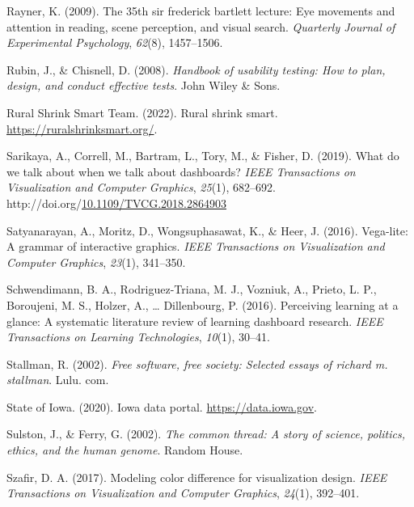 \documentclass[print]{nuthesis}
\newlength{\cslhangindent}
\newenvironment{CSLReferences}[2]%
{\setlength{\parindent}{0pt}%
\everypar{\setlength{\hangindent}{\cslhangindent}}\ignorespaces}%
{\par}
\begin{document}
\begin{CSLReferences}{1}{0}
\leavevmode{}%
Rayner, K. (2009). The 35th sir frederick bartlett lecture: Eye movements and attention in reading, scene perception, and visual search. \emph{Quarterly Journal of Experimental Psychology}, \emph{62}(8), 1457--1506.

\leavevmode{}%
Rubin, J., \& Chisnell, D. (2008). \emph{Handbook of usability testing: How to plan, design, and conduct effective tests}. John Wiley \& Sons.

\leavevmode{}%
Rural Shrink Smart Team. (2022). Rural shrink smart. \url{https://ruralshrinksmart.org/}.

\leavevmode{}%
Sarikaya, A., Correll, M., Bartram, L., Tory, M., \& Fisher, D. (2019). What do we talk about when we talk about dashboards? \emph{IEEE Transactions on Visualization and Computer Graphics}, \emph{25}(1), 682--692. http://doi.org/\href{https://doi.org/10.1109/TVCG.2018.2864903}{10.1109/TVCG.2018.2864903}

\leavevmode{}%
Satyanarayan, A., Moritz, D., Wongsuphasawat, K., \& Heer, J. (2016). Vega-lite: A grammar of interactive graphics. \emph{IEEE Transactions on Visualization and Computer Graphics}, \emph{23}(1), 341--350.

\leavevmode{}%
Schwendimann, B. A., Rodriguez-Triana, M. J., Vozniuk, A., Prieto, L. P., Boroujeni, M. S., Holzer, A., \ldots{} Dillenbourg, P. (2016). Perceiving learning at a glance: A systematic literature review of learning dashboard research. \emph{IEEE Transactions on Learning Technologies}, \emph{10}(1), 30--41.

\leavevmode{}%
Stallman, R. (2002). \emph{Free software, free society: Selected essays of richard m. stallman}. Lulu. com.

\leavevmode{}%
State of Iowa. (2020). Iowa data portal. \url{https://data.iowa.gov}.

\leavevmode{}%
Sulston, J., \& Ferry, G. (2002). \emph{The common thread: A story of science, politics, ethics, and the human genome}. Random House.

\leavevmode{}%
Szafir, D. A. (2017). Modeling color difference for visualization design. \emph{IEEE Transactions on Visualization and Computer Graphics}, \emph{24}(1), 392--401.


\end{CSLReferences}
\end{document}
